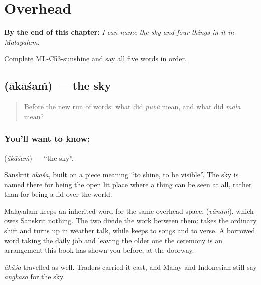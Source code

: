 
\chapter{Overhead}
\label{ch:ml-overhead}

\begin{chapteropening}
\textbf{By the end of this chapter:} \emph{I can name the sky and four things in it in Malayalam.}

Complete ML-C53-sunshine and say all five words in order.
\end{chapteropening}

\section[\texorpdfstring{\ml{ആകാശം} (ākāśaṁ)}{ആകാശം (ākāśaṁ)}]{ (ākāśaṁ) — the sky}

\label{lesson:ML-C53-sky}



\begin{quote}
Before the new run of words: what did \emph{pūvŭ} mean, and what did \emph{māla} mean?
\end{quote}

\subsection*{You'll want to know: }
\textbf{} (\emph{ākāśaṁ}) — \textquotedblleft{}the sky\textquotedblright{}.

Sanskrit \emph{ākāśa}, built on a piece meaning \textquotedblleft{}to shine, to be visible\textquotedblright{}. The sky is named there for being the open lit place where a thing can be seen at all, rather than for being a lid over the world.

Malayalam keeps an inherited word for the same overhead space,  (\emph{vānaṁ}), which owes Sanskrit nothing. The two divide the work between them:  takes the ordinary shift and turns up in weather talk, while  keeps to songs and to verse. A borrowed word taking the daily job and leaving the older one the ceremony is an arrangement this book has shown you before, at the doorway.

\emph{ākāśa} travelled as well. Traders carried it east, and Malay and Indonesian still say \emph{angkasa} for the sky.


